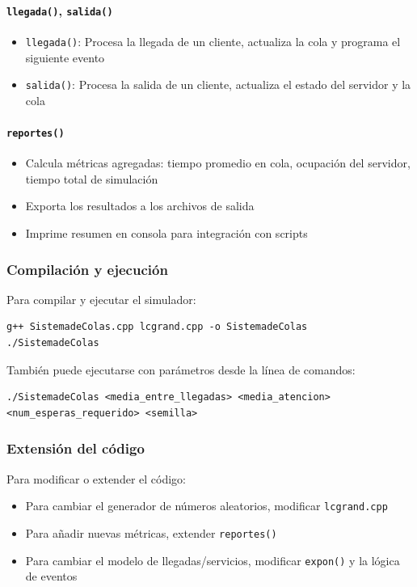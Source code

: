 \documentclass{article}
\begin{document}
\paragraph{\texttt{llegada()}, \texttt{salida()}}
\begin{itemize}
    \item \texttt{llegada()}: Procesa la llegada de un cliente, actualiza la cola y programa el siguiente evento
    \item \texttt{salida()}: Procesa la salida de un cliente, actualiza el estado del servidor y la cola
\end{itemize}

\paragraph{\texttt{reportes()}}
\begin{itemize}
    \item Calcula métricas agregadas: tiempo promedio en cola, ocupación del servidor, tiempo total de simulación
    \item Exporta los resultados a los archivos de salida
    \item Imprime resumen en consola para integración con scripts
\end{itemize}

\subsubsection{Compilación y ejecución}

Para compilar y ejecutar el simulador:

\begin{verbatim}
g++ SistemadeColas.cpp lcgrand.cpp -o SistemadeColas
./SistemadeColas
\end{verbatim}

También puede ejecutarse con parámetros desde la línea de comandos:

\begin{verbatim}
./SistemadeColas <media_entre_llegadas> <media_atencion> <num_esperas_requerido> <semilla>
\end{verbatim}

\subsubsection{Extensión del código}

Para modificar o extender el código:
\begin{itemize}
    \item Para cambiar el generador de números aleatorios, modificar \texttt{lcgrand.cpp}
    \item Para añadir nuevas métricas, extender \texttt{reportes()}
    \item Para cambiar el modelo de llegadas/servicios, modificar \texttt{expon()} y la lógica de eventos
\end{itemize}
\end{document}
